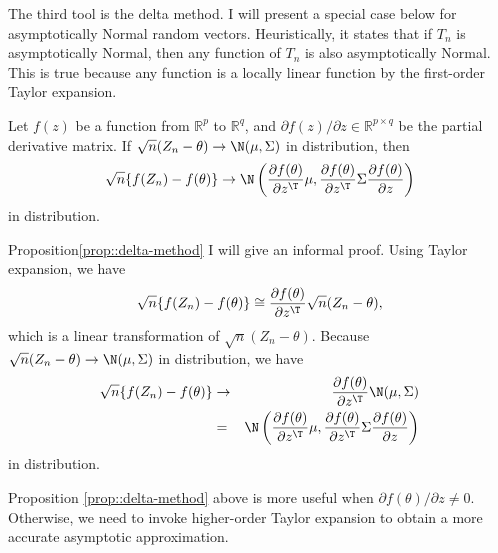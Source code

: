The third tool is the delta method. I will present a special case below for asymptotically Normal random vectors. Heuristically, it states that if $T_n$ is asymptotically Normal, then any function of $T_n$ is also asymptotically Normal. This is true because any function is a locally linear function by the first-order Taylor expansion. 

\begin{proposition}\label{prop::delta-method}
Let $f(z)$ be a function from $\mathbb{R}^p$ to $\mathbb{R}^q$, and $\partial f(z) / \partial z \in \mathbb{R}^{p\times q}$ be the partial derivative matrix. 
If $\sqrt{n} (Z_n - \theta) \rightarrow \N(\mu, \Sigma)$ in distribution, then 
$$
\sqrt{n} \{ f(Z_n) - f(\theta) \} \rightarrow \N\left( 
\frac{ \partial f(\theta) }{  \partial z^{\T} } \mu, \frac{ \partial f(\theta) }{  \partial z^{\T} } \Sigma \frac{ \partial f(\theta) }{  \partial z}
\right)
$$
in distribution. 
\end{proposition}

\begin{myproof}{Proposition}{\ref{prop::delta-method}}
I will give an informal proof. Using Taylor expansion, we have
$$
\sqrt{n} \{ f(Z_n)   - f(\theta) \}\cong  \frac{ \partial f(\theta) }{  \partial z^{\T} } \sqrt{n} (Z_n - \theta),
$$
which is a linear transformation of $\sqrt{n} (Z_n - \theta)$. Because $\sqrt{n} (Z_n - \theta) \rightarrow \N(\mu, \Sigma)$ in distribution, we have
\begin{eqnarray*}
\sqrt{n} \{ f(Z_n)   - f(\theta) \} 
&\rightarrow &  \frac{ \partial f(\theta) }{  \partial z^{\T} }\N(\mu, \Sigma) \\
&=& \N\left( 
\frac{ \partial f(\theta) }{  \partial z^{\T} } \mu, \frac{ \partial f(\theta) }{  \partial z^{\T} } \Sigma \frac{ \partial f(\theta) }{  \partial z}
\right)
\end{eqnarray*}
in distribution. 
\end{myproof}



Proposition \ref{prop::delta-method} above is more useful when $\partial f(\theta) /   \partial z \neq 0$. Otherwise, we need to invoke higher-order Taylor expansion to obtain a more accurate asymptotic approximation. 
 
 


